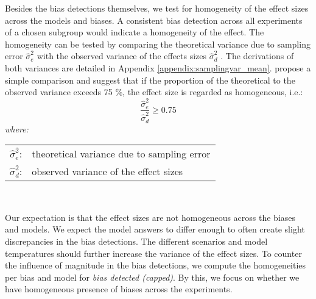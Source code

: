 \par Besides the bias detections themselves, we test for homogeneity of the effect sizes across the models and biases. A consistent bias detection across all experiments of a chosen subgroup would indicate a homogeneity of the effect. The homogeneity can be tested by comparing the theoretical variance due to sampling error $\hat{\sigma}^2_{e}$ with the observed variance of the effects sizes $\hat{\sigma}^2_{d}$ \parencite{borenstein2021introduction, cooper2019handbook, morris2002combining, nakagawa2023quantitative}. The derivations of both variances are detailed in Appendix \ref{appendix:samplingvar_mean}. \textcite{hunter2004methods} propose a simple comparison and suggest that if the proportion of the theoretical to the observed variance exceeds 75 \%, the effect size is regarded as homogeneous, i.e.:
\begin{equation} \label{eq:homogeneity}
    \frac{\hat{\sigma}^2_{e}}{\hat{\sigma}^2_{d}} \geq 0.75
\end{equation}
\hspace{0.5cm} \textit{where:} \\
\hspace*{3em}
\begin{tabular}{rl}
    $\hat{\sigma}^2_{e}$:& theoretical variance due to sampling error \\
    $\hat{\sigma}^2_{d}$:& observed variance of the effect sizes \\
\end{tabular} \\

\par Our expectation is that the effect sizes are not homogeneous across the biases and models. We expect the model answers to differ enough to often create slight discrepancies in the bias detections. The different scenarios and model temperatures should further increase the variance of the effect sizes. To counter the influence of magnitude in the bias detections, we compute the homogeneities per bias and model for \textit{bias detected (capped)}. By this, we focus on whether we have homogeneous presence of biases across the experiments.

